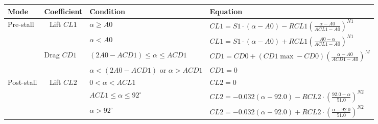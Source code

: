 \begin{table}[!htb]
    \centering
    \renewcommand{\arraystretch}{2.5} %
    \footnotesize %
    \begin{tabular}{llll}
        \hline
        Mode                        & Coefficient                                     & Condition                                   & Equation                                                                                                                    \\ \hline
        \multirow{4}{*}{Pre-stall}  & \multicolumn{1}{c}{\multirow{2}{*}{Lift $CL1$}} & $\alpha \geq A0$                            & $C L1=S1\cdot\left(\alpha-A0\right)-R C L1\left(\frac{\alpha-A0}{A C L1-A0}\right)^{N1}$                                    \\
                                    & \multicolumn{1}{c}{}                            & $\alpha < A0$                               & $CL1=S1\cdot(\alpha-A0)+R C L1\left(\frac{A0-\alpha}{A C L1-A0}\right)^{N1}$                                                \\ \cline{2-4} 
                                    & \multirow{2}{*}{Drag $CD1$}                     & $(2 A0 - ACD1) \leq \alpha \leq ACD1$       & $C D1=C D0+\left(C D1\operatorname*{max}-C D0\right)\left({\frac{\alpha-A0}{A C D1-A0}}\right)^{M}$                         \\
                                    &                                                 & $\alpha < (2 A0 - ACD1)$ or $\alpha > ACD1$ & $CD1=0$                                                                                                                     \\ \hline
        \multirow{7}{*}{Post-stall} & \multicolumn{1}{c}{\multirow{4}{*}{Lift $CL2$}} & $0 < \alpha < ACL1$                         & $CL2=0$                                                                                                                     \\
                                    & \multicolumn{1}{c}{}                            & $ACL1 \leq \alpha \leq 92^{\circ}$          & $CL2=-0.032\left(\alpha-92.0\right) - RCL2\cdot\left({\frac{92.0-\alpha}{51.0}}\right)^{N2}$                                \\
                                    & \multicolumn{1}{c}{}                            & $\alpha > 92^{\circ}$                       & $CL2=-0.032\left(\alpha-92.0\right) + RCL2 \cdot \left(\frac{\alpha-92.0}{51.0}\right)^{N2}$                                \\

\end{tabular}
\end{table}
